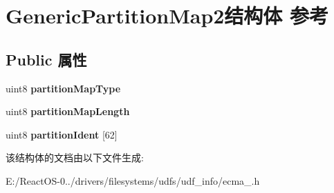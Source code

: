 \hypertarget{struct_generic_partition_map2}{}\section{Generic\+Partition\+Map2结构体 参考}
\label{struct_generic_partition_map2}
\subsection*{Public 属性}
\begin{DoxyCompactItemize}
\item 
\mbox{\label{struct_generic_partition_map2_ae37488977914f8c34c12789a4d5379e7}} 
uint8 {\bfseries partition\+Map\+Type}
\item 
\mbox{\label{struct_generic_partition_map2_a73793198333722df4a167bed294e5b9e}} 
uint8 {\bfseries partition\+Map\+Length}
\item 
\mbox{\label{struct_generic_partition_map2_a7e5545a431c8bae8c60316c4a77b335f}} 
uint8 {\bfseries partition\+Ident} \mbox{[}62\mbox{]}
\end{DoxyCompactItemize}


该结构体的文档由以下文件生成\+:\begin{DoxyCompactItemize}
\item 
E\+:/\+React\+O\+S-\/0../drivers/filesystems/udfs/udf\+\_\+info/ecma\+\_.\+h\end{DoxyCompactItemize}

